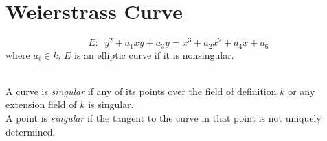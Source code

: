 \section{Weierstrass Curve}

\[
E: \,\,\, y^2+a_1 xy+a_3y=x^3+a_2x^2+a_4x+a_6
\]
where $a_i \in k$, $E$ is an elliptic curve if it is nonsingular.

\begin{definition}[Singular] \ \\
A curve is \emph{singular} if any of its points over the field of definition $k$ or any extension field of $k$ is singular. \\
A point is \emph{singular} if the tangent to the curve in that point is not uniquely determined.
\end{definition}

